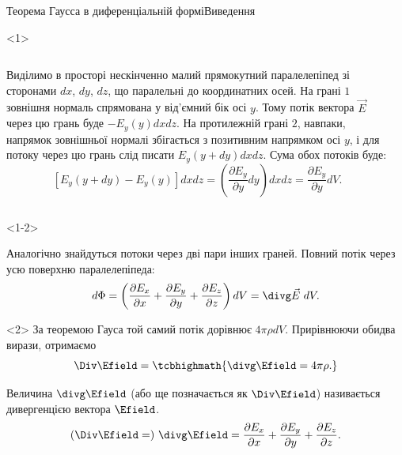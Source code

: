 \documentclass{beamer}
\begin{document}
\begin{frame}{Теорема Гаусса в диференціальній формі}{Виведення}
	\begin{onlyenv}
		\begin{columns}
			\begin{column}{0.6\linewidth}\justifying\small
				Виділимо в просторі нескінченно малий прямокутний паралелепіпед зі
				сторонами $dx$, $dy$, $dz$, що паралельні до координатних осей. На
				грані $1$ зовнішня нормаль спрямована у від'ємний бік осі $y$.
				Тому потік вектора $\vec{E}$ через цю грань буде $-E_y(y) dx dz$.
				На протилежній грані $2$, навпаки, напрямок зовнішньої нормалі
				збігається з позитивним напрямком осі $y$, і для потоку через цю
				грань слід писати $E_y(y + dy) dx dz$. Сума обох потоків буде:
				\begin{equation*}
					\left[E_y(y + dy) - E_y(y) \right] dxdz = \left( \frac{\partial
						E_y}{\partial y} dy\right) dxdz = \frac{\partial
						E_y}{\partial y} dV.
				\end{equation*}
			\end{column}
			\begin{column}{0.4\linewidth}\centering
				
			\end{column}
		\end{columns}
	\end{onlyenv}
	\begin{onlyenv}<1-2>
		\begin{block}{}
			Аналогічно знайдуться потоки через дві пари інших граней. Повний потік
			через усю поверхню паралелепіпеда:
			\begin{equation*}
				d\Phi = \left( \frac{\partial E_x}{\partial x} + \frac{\partial
					E_y}{\partial y} + \frac{\partial E_z}{\partial z} \right)  dV =
				\divg\vec{E}\ dV.
			\end{equation*}
		\end{block}
	\end{onlyenv}
	\begin{onlyenv}
		За теоремою Гауса той самий потік дорівнює $4\pi\rho dV$. Прирівнюючи обидва
		вирази, отримаємо
		\begin{equation*}
			\Div\Efield = \tcbhighmath{
				\divg\Efield = 4\pi\rho.
			}
		\end{equation*}
		\begin{block}{}\justifying
			Величина $\divg\Efield$ (або ще позначається як $\Div\Efield$)
			називається дивергенцією вектора $\Efield$.
			\begin{equation*}
				(\Div\Efield = )\ \divg\Efield = \frac{\partial
					E_x}{\partial
					x} +
				\frac{\partial
					E_y}{\partial y} + \frac{\partial E_z}{\partial z}.
			\end{equation*}
		\end{block}
	\end{onlyenv}
\end{frame}
\end{document}
